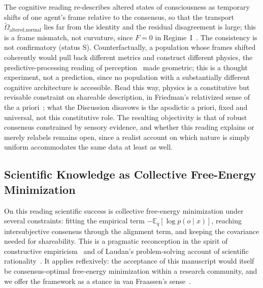 \documentclass[11pt]{article}
\begin{document}
The cognitive reading re-describes altered states of consciousness as temporary shifts of one agent's frame relative to the consensus, so that the transport $\tilde{\Omega}_{\text{altered,normal}}$ lies far from the identity and the residual disagreement is large; this is a frame mismatch, not curvature, since $F = 0$ in Regime~I~\cite{Carhart-Harris2014, Swanson2018, CarhartHarrisFriston2019}. The consistency is not confirmatory (status S). Counterfactually, a population whose frames shifted coherently would pull back different metrics and construct different physics, the predictive-processing reading of perception~\cite{Clark2016, Seth2021, Hoffman2019, hohwy2013predictive} made geometric; this is a thought experiment, not a prediction, since no population with a substantially different cognitive architecture is accessible. Read this way, physics is a constitutive but revisable constraint on shareable description, in Friedman's relativized sense of the a priori~\cite{Friedman2001}; what the Discussion disavows is the apodictic a priori, fixed and universal, not this constitutive role. The resulting objectivity is that of robust consensus constrained by sensory evidence, and whether this reading explains or merely relabels remains open, since a realist account on which nature is simply uniform accommodates the same data at least as well.

\subsection{Scientific Knowledge as Collective Free-Energy Minimization}

On this reading scientific success is collective free-energy minimization under several constraints: fitting the empirical term $-\mathbb{E}_q[\log p(o \mid x)]$, reaching intersubjective consensus through the alignment term, and keeping the covariance needed for shareability. This is a pragmatic reconception in the spirit of constructive empiricism~\cite{vanFraassen1980} and of Laudan's problem-solving account of scientific rationality~\cite{Laudan1977}. It applies reflexively: the acceptance of this manuscript would itself be consensus-optimal free-energy minimization within a research community, and we offer the framework as a stance in van Fraassen's sense~\cite{vanFraassen2002}.
\end{document}
